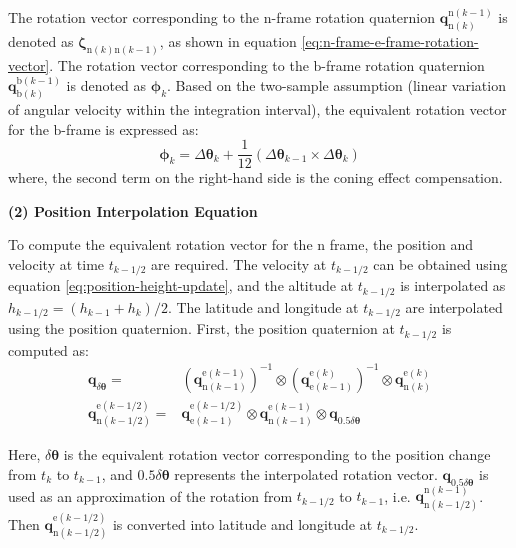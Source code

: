 \documentclass{article}
\begin{document}
The rotation vector corresponding to the $\mathrm{n}$-frame rotation quaternion $\mathbf{q}_{\mathrm{n}(k)}^{\mathrm{n}(k-1)}$ is denoted as $\boldsymbol{\zeta}_{\mathrm{n}(k)\mathrm{n}(k-1)}$, as shown in equation \eqref{eq:n-frame-e-frame-rotation-vector}. The rotation vector corresponding to the $\mathrm{b}$-frame rotation quaternion $\mathbf{q}_{\mathrm{b}(k)}^{\mathrm{b}(k-1)}$ is denoted as $\boldsymbol{\phi}_{k}$. Based on the two-sample assumption (linear variation of angular velocity within the integration interval), the equivalent rotation vector for the $\mathrm{b}$-frame is expressed as:
\begin{equation}
    \boldsymbol{\phi}_{k} = \Delta \boldsymbol{\theta}_{k} + \frac{1}{12} \left( \Delta \boldsymbol{\theta}_{k-1} \times \Delta \boldsymbol{\theta}_{k} \right)
    \label{eq:b-frame-rotation-vector}
\end{equation}
where, the second term on the right-hand side is the coning effect compensation.

\textbf{(2) Position Interpolation Equation}

To compute the equivalent rotation vector for the $\mathrm{n}$ frame, the position and velocity at time $t_{k-1/2}$ are required. The velocity at $t_{k-1/2}$ can be obtained using equation \eqref{eq:position-height-update}, and the altitude at $t_{k-1/2}$ is interpolated as ${h}_{k-1/2} = ({h}_{k-1} + {h}_{k})/2$. The latitude and longitude at $t_{k-1/2}$ are interpolated using the position quaternion. First, the position quaternion at $t_{k-1/2}$ is computed as:
\begin{equation}
    \begin{aligned}
        \mathbf{q}_{\delta \boldsymbol{\theta}} =& \left(\mathbf{q}_{\mathrm{n}(k-1)}^{\mathrm{e}(k-1)}\right)^{-1} \otimes \left(\mathbf{q}_{\mathrm{e}(k-1)}^{\mathrm{e}(k)}\right)^{-1} \otimes \mathbf{q}_{\mathrm{n}(k)}^{\mathrm{e}(k)} \\
        \mathbf{q}_{\mathrm{n}(k-1/2)}^{\mathrm{e}(k-1/2)} =& \mathbf{q}_{\mathrm{e}(k-1)}^{\mathrm{e}(k-1/2)} \otimes \mathbf{q}_{\mathrm{n}(k-1)}^{\mathrm{e}(k-1)} \otimes \mathbf{q}_{0.5 \delta \boldsymbol{\theta}}
    \end{aligned} 
    \label{eq:position-quaternion-interpolation}
\end{equation}

Here, $\delta \boldsymbol{\theta}$ is the equivalent rotation vector corresponding to the position change from $t_k$ to $t_{k-1}$, and $0.5 \delta \boldsymbol{\theta}$ represents the interpolated rotation vector. $\mathbf{q}_{0.5 \delta \boldsymbol{\theta}}$ is used as an approximation of the rotation from $t_{k-1/2}$ to $t_{k-1}$, i.e. $\mathbf{q}_{\mathrm{n}(k-1/2)}^{\mathrm{n}(k-1)}$. Then $\mathbf{q}_{\mathrm{n}(k-1/2)}^{\mathrm{e}(k-1/2)}$ is converted into latitude and longitude at $t_{k-1/2}$.
\end{document}

